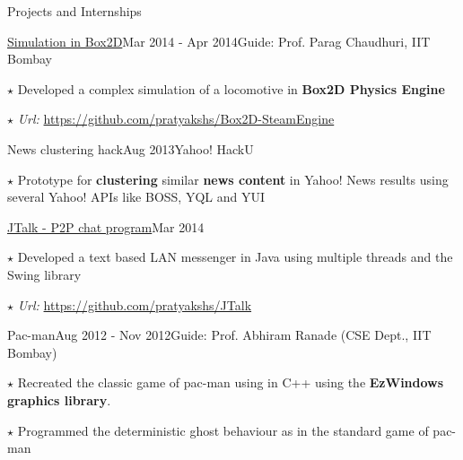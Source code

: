 \documentclass{resume2} %
\begin{document}
\begin{rSection}{Projects and Internships}
\begin{rSubsection}{\href{https://github.com/pratyakshs/Box2D-SteamEngine}{Simulation in Box2D}}{Mar 2014 - Apr 2014}{Guide: Prof. Parag Chaudhuri, IIT Bombay}{}
\item[$\star$] Developed a complex simulation of a locomotive in \textbf{Box2D Physics Engine} 
\item[$\star$] \emph{Url:} \url{https://github.com/pratyakshs/Box2D-SteamEngine}
\end{rSubsection}




\begin{rSubsection}{News clustering hack}{Aug 2013}{Yahoo! HackU}{}
\item[$\star$] Prototype for \textbf{clustering} similar \textbf{news content} in Yahoo! News results using several Yahoo! APIs like BOSS, YQL and YUI
\end{rSubsection}

\begin{rSubsection}{\href{https://github.com/pratyakshs/JTalk}{JTalk - P2P chat program}}{Mar 2014}{}{}
\item[$\star$] Developed a text based LAN messenger in Java using multiple threads and the Swing library
\item[$\star$] \emph{Url:} \url{https://github.com/pratyakshs/JTalk}
\end{rSubsection}

\begin{rSubsection}{Pac-man}{Aug 2012 - Nov 2012}{Guide: Prof. Abhiram Ranade (CSE Dept., IIT Bombay)
}{}
\item[$\star$] Recreated the classic game of pac-man using in C++ using the \textbf{EzWindows graphics library}.
\item[$\star$] Programmed the deterministic ghost behaviour as in the standard game of pac-man
\end{rSubsection}


\end{rSection}
\end{document}
